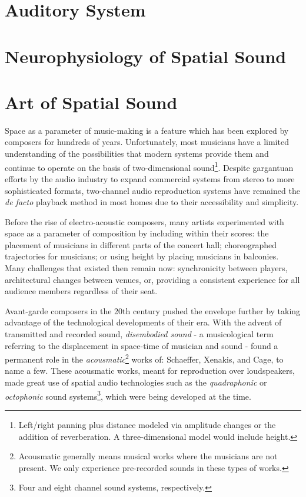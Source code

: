 
\section{Auditory System}


\section{Neurophysiology of Spatial Sound}

\section{Art of Spatial Sound}

Space as a parameter of music-making is a feature which has been explored by composers for hundreds of years. Unfortunately, most musicians have a limited understanding of the possibilities that modern systems provide them and continue to operate on the basis of two-dimensional sound\footnote{Left/right panning plus distance modeled via amplitude changes or the addition of reverberation. A three-dimensional model would include height.}. Despite gargantuan efforts by the audio industry to expand commercial systems from stereo to more sophisticated formats, two-channel audio reproduction systems have remained the \textit{de facto} playback method in most homes due to their accessibility and simplicity. 

Before the rise of electro-acoustic composers, many artists experimented with space as a parameter of composition by including within their scores: the placement of musicians in different parts of the concert hall; choreographed trajectories for musicians; or using height by placing musicians in balconies. Many challenges that existed then remain now: synchronicity between players, architectural changes between venues, or, providing a consistent experience for all audience members regardless of their seat. 

Avant-garde composers in the 20th century pushed the envelope further by taking advantage of the technological developments of their era. With the advent of transmitted and recorded sound, \textit{disembodied sound} - a musicological term referring to the displacement in space-time of musician and sound - found a permanent role in the \textit{acousmatic}\footnote{Acousmatic generally means musical works where the musicians are not present. We only experience pre-recorded sounds in these types of works.} works of: Schaeffer, Xenakis, and Cage, to name a few. These acousmatic works, meant for reproduction over loudspeakers, made great use of spatial audio technologies such as the \textit{quadraphonic} or \textit{octophonic} sound systems\footnote{Four and eight channel sound systems, respectively.}, which were being developed at the time. 

